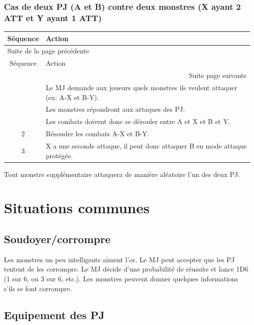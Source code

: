 \documentclass[a4paper, 11pt, twoside]{article}
\begin{document}
\subsubsection{Cas de deux PJ (A et B) contre deux monstres (X ayant 2 ATT et Y ayant 1 ATT)}
\label{sec:orgadda7fa}

\begin{longtable}{c|l}
Séquence & Action\\
\hline
\endfirsthead
\multicolumn{2}{l}{Suite de la page précédente} \\
\hline

Séquence & Action \\

\hline
\endhead
\hline\multicolumn{2}{r}{Suite page suivante} \\
\endfoot
\endlastfoot
\hline
1 & Le MJ demande aux joueurs quels monstres ils veulent attaquer (ex: A-X et B-Y).\\
 & Les monstres répondront aux attaques des PJ.\\
 & Les combats doivent donc se dérouler entre A et X et B et Y.\\
2 & Résoudre les combats A-X et B-Y.\\
3 & X a une seconde attaque, il peut donc attaquer B en mode attaque protégée.\\
\end{longtable}

Tout monstre supplémentaire attaquera de manière aléatoire l'un des deux PJ.

\section{Situations communes}
\label{sec:org6efb77c}
\subsection{Soudoyer/corrompre}
\label{sec:org08ac89f}

Les monstres un peu intelligents aiment l'or. Le MJ peut accepter que les PJ tentent de les corrompre. Le MJ décide d'une probabilité de réussite et lance 1D6 (1 sur 6, ou 3 sur 6, etc.). Les monstres peuvent donner quelques informations s'ils se font corrompre.

\subsection{Equipement des PJ}
\label{sec:orgdc3df8b}
\end{document}
